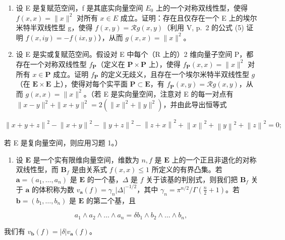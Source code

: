 \exercisegroup

\begin{enumerate}
\def\labelenumi{\arabic{enumi})}
\item
  设 E 是复赋范空间，f 是其底实向量空间 \(E_{0}\) 上的一个对称双线性型，使得 \(f(x, x) = \|x\|^{2}\) 对所有 \(x \in E\) 成立。证明：存在且仅存在一个 E 上的埃尔米特半双线性型 g，使得 \(f(x, y) = \mathcal{R}g(x, y)\)（利用 V, p.~2 的公式 (5) 证明 \(f(x, iy) = -f(ix, y)\)），从而 \(g(x, x) = \|x\|^{2}\)。
\item
  设 E 是实或复赋范空间。假设对 E 中每个（R 上的）2 维向量子空间 P，都存在一个对称双线性型 \(f_{\mathbf{P}}\)（定义在 \(\mathbf{P} \times \mathbf{P}\) 上），使得 \(f_{\mathbf{P}}(x,x) = \| x\|^2\) 对所有 \(x \in \mathbf{P}\) 成立。证明 \(f_{\mathbf{P}}\) 的定义无歧义，且存在一个埃尔米特半双线性型 \(g\)（在 \(\mathbf{E} \times \mathbf{E}\) 上），使得对每个实平面 \(\mathbf{P} \subset \mathbf{E}\)，有 \(f_{\mathbf{P}}(x,y) = \mathcal{R}g(x,y)\)，从而 \(g(x,x) = \| x\|^2\)。（若 E 是实向量空间，注意对 E 的每一对点有 \(\| x - y\|^2 + \| x + y\|^2 = 2(\| x\|^2 + \| y\|^2)\)，并由此导出恒等式
\end{enumerate}

\[
\left\| x + y + z \right\| ^ {2} - \left\| x + y \right\| ^ {2} - \left\| y + z \right\| ^ {2} - \left\| z + x \right\| ^ {2} + \left\| x \right\| ^ {2} + \left\| y \right\| ^ {2} + \left\| z \right\| ^ {2} = 0;
\]

若 E 是复向量空间，则应用习题 1。）

\begin{enumerate}
\def\labelenumi{\arabic{enumi})}
\setcounter{enumi}{2}
\tightlist
\item
  设 \(\mathbf{E}\) 是一个实有限维向量空间，维数为 \(n, f\) 是 \(\mathbf{E}\) 上的一个正且非退化的对称双线性型，而 \(\mathbf{B}_f\) 是由关系式 \(f(x, x) \leqslant 1\) 所定义的有界凸集。若 \(\mathbf{a} = (a_1, \ldots, a_n)\) 是 \(\mathbf{E}\) 的一个基，\(\Delta\) 是 \(f\) 关于该基的判别式，则我们把 \(\mathbf{B}_f\) 关于 \(\mathbf{a}\) 的体积称为数 \(v_{\mathbf{a}}(f) = \gamma_n |\Delta|^{-1/2}\)，其中 \(\gamma_n = \pi^{n/2} / \Gamma\left(\frac{n}{2} + 1\right)\)。若 \(\mathbf{b} = (b_1, \ldots, b_n)\) 是 \(\mathbf{E}\) 的第二个基，且
\end{enumerate}

\[
a _ {1} \wedge a _ {2} \wedge \dots \wedge a _ {n} = \delta b _ {1} \wedge b _ {2} \wedge \dots \wedge b _ {n},
\]

我们有 \(v_{\mathbf{b}}(f) = |\delta| v_{\mathbf{a}}(f)\)。

